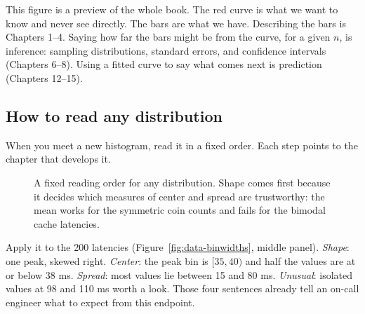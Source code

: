 \begin{happeningbox}
This figure is a preview of the whole book. The red curve is what we want to know and never
see directly. The bars are what we have. Describing the bars is Chapters 1--4. Saying how far
the bars might be from the curve, for a given $n$, is inference: sampling distributions,
standard errors, and confidence intervals (Chapters 6--8). Using a fitted curve to say what
comes next is prediction (Chapters 12--15).
\end{happeningbox}

\subsection{How to read any distribution}

When you meet a new histogram, read it in a fixed order. Each step points to the chapter that
develops it.

\begin{figure}[H]
\centering
{}
\caption{A fixed reading order for any distribution. Shape comes first because it decides
which measures of center and spread are trustworthy: the mean works for the symmetric coin
counts and fails for the bimodal cache latencies.}
\label{fig:data-reading-order}
\end{figure}

Apply it to the 200 latencies (Figure~\ref{fig:data-binwidths}, middle panel). \emph{Shape}:
one peak, skewed right. \emph{Center}: the peak bin is $[35,40)$ and half the values are at or
below 38 ms. \emph{Spread}: most values lie between 15 and 80 ms. \emph{Unusual}: isolated
values at 98 and 110 ms worth a look. Those four sentences already tell an on-call engineer
what to expect from this endpoint.

